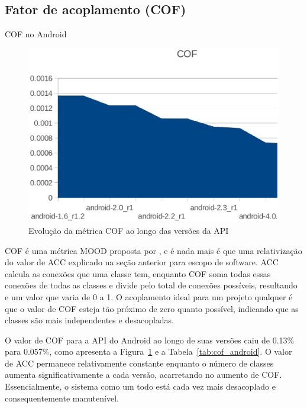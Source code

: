 \subsection{Fator de acoplamento (COF)}

\begin{table}[!htb]
\centering
{}

\caption{COF no Android}
\label{tab:cof_android}
\end{table}

\begin{figure}[!htb]
\centering
\includegraphics [keepaspectratio=true,scale=0.7]{figuras/graphs/cof_android.eps}
\caption{Evolução da métrica COF ao longo das versões da API}
\label{fig:cof_android}
\end{figure}


COF é uma métrica MOOD proposta por , e é nada mais é que uma relativização do valor de ACC explicado na seção anterior para escopo de software. ACC calcula as conexões que uma classe tem, enquanto COF soma todas essas conexões de todas as classes e divide pelo total de conexões possíveis, resultando e um valor que varia de 0 a 1. O acoplamento ideal para um projeto qualquer é que o valor de COF esteja tão próximo de zero quanto possível, indicando que as classes são mais independentes e desacopladas.

O valor de COF para a API do Android ao longo de suas versões caiu de 0.13\% para 0.057\%, como apresenta a Figura~\ref{fig:cof_android} e a Tabela~\ref{tab:cof_android}. O valor de ACC permanece relativamente constante enquanto o número de classes aumenta significativamente a cada versão, acarretando no aumento de COF. Essencialmente, o sistema como um todo está cada vez mais desacoplado e consequentemente manutenível. 

